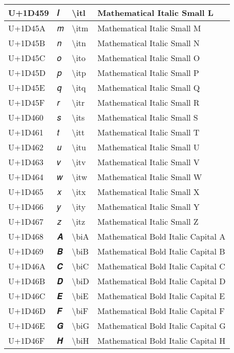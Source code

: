 \begin{table}[h]
\begin{tabulary}{\linewidth}{|L|L|L|L|}
\hline
U+1D459 & 𝑙 & {\textbackslash}itl & Mathematical Italic Small L \\
\hline
U+1D45A & 𝑚 & {\textbackslash}itm & Mathematical Italic Small M \\
\hline
U+1D45B & 𝑛 & {\textbackslash}itn & Mathematical Italic Small N \\
\hline
U+1D45C & 𝑜 & {\textbackslash}ito & Mathematical Italic Small O \\
\hline
U+1D45D & 𝑝 & {\textbackslash}itp & Mathematical Italic Small P \\
\hline
U+1D45E & 𝑞 & {\textbackslash}itq & Mathematical Italic Small Q \\
\hline
U+1D45F & 𝑟 & {\textbackslash}itr & Mathematical Italic Small R \\
\hline
U+1D460 & 𝑠 & {\textbackslash}its & Mathematical Italic Small S \\
\hline
U+1D461 & 𝑡 & {\textbackslash}itt & Mathematical Italic Small T \\
\hline
U+1D462 & 𝑢 & {\textbackslash}itu & Mathematical Italic Small U \\
\hline
U+1D463 & 𝑣 & {\textbackslash}itv & Mathematical Italic Small V \\
\hline
U+1D464 & 𝑤 & {\textbackslash}itw & Mathematical Italic Small W \\
\hline
U+1D465 & 𝑥 & {\textbackslash}itx & Mathematical Italic Small X \\
\hline
U+1D466 & 𝑦 & {\textbackslash}ity & Mathematical Italic Small Y \\
\hline
U+1D467 & 𝑧 & {\textbackslash}itz & Mathematical Italic Small Z \\
\hline
U+1D468 & 𝑨 & {\textbackslash}biA & Mathematical Bold Italic Capital A \\
\hline
U+1D469 & 𝑩 & {\textbackslash}biB & Mathematical Bold Italic Capital B \\
\hline
U+1D46A & 𝑪 & {\textbackslash}biC & Mathematical Bold Italic Capital C \\
\hline
U+1D46B & 𝑫 & {\textbackslash}biD & Mathematical Bold Italic Capital D \\
\hline
U+1D46C & 𝑬 & {\textbackslash}biE & Mathematical Bold Italic Capital E \\
\hline
U+1D46D & 𝑭 & {\textbackslash}biF & Mathematical Bold Italic Capital F \\
\hline
U+1D46E & 𝑮 & {\textbackslash}biG & Mathematical Bold Italic Capital G \\
\hline
U+1D46F & 𝑯 & {\textbackslash}biH & Mathematical Bold Italic Capital H \\

\end{tabulary}
\end{table}
